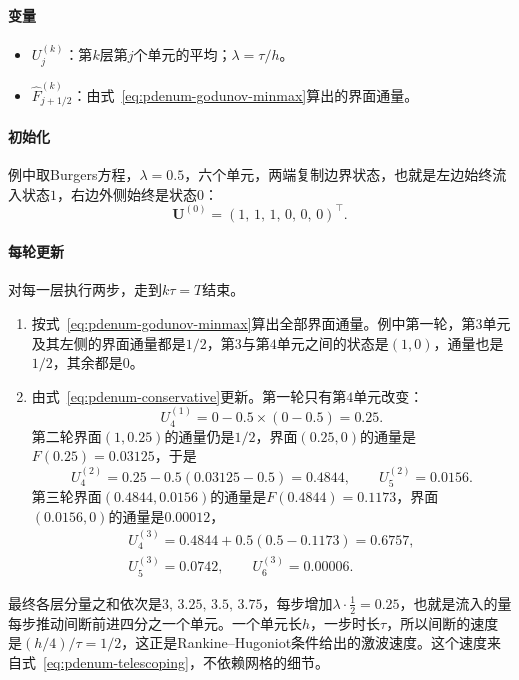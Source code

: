 \paragraph{变量}
\begin{itemize}
 \item $U_j^{(k)}$：第$k$层第$j$个单元的平均；$\lambda=\tau/h$。
 \item $\widehat{F}_{j+1/2}^{(k)}$：由式~\eqref{eq:pdenum-godunov-minmax}算出的界面通量。
\end{itemize}

\paragraph{初始化}
例中取Burgers方程，$\lambda=0.5$，六个单元，两端复制边界状态，也就是左边始终流入状态$1$，右边外侧始终是状态$0$：
\[
 \bm{U}^{(0)}=(1,\,1,\,1,\,0,\,0,\,0)^\top .
\]

\paragraph{每轮更新}
对每一层执行两步，走到$k\tau=T$结束。
\begin{enumerate}
 \item 按式~\eqref{eq:pdenum-godunov-minmax}算出全部界面通量。例中第一轮，第$3$单元及其左侧的界面通量都是$1/2$，第$3$与第$4$单元之间的状态是$(1,0)$，通量也是$1/2$，其余都是$0$。
 \item 由式~\eqref{eq:pdenum-conservative}更新。第一轮只有第$4$单元改变：
 \[
  U_4^{(1)}=0-0.5\times(0-0.5)=0.25 .
 \]
 第二轮界面$(1,0.25)$的通量仍是$1/2$，界面$(0.25,0)$的通量是$F(0.25)=0.03125$，于是
 \[
  U_4^{(2)}=0.25-0.5(0.03125-0.5)=0.4844,\qquad U_5^{(2)}=0.0156 .
 \]
 第三轮界面$(0.4844,0.0156)$的通量是$F(0.4844)=0.1173$，界面$(0.0156,0)$的通量是$0.00012$，
 \[
  \begin{gathered}
  U_4^{(3)}=0.4844+0.5(0.5-0.1173)=0.6757,\\
  U_5^{(3)}=0.0742,\qquad U_6^{(3)}=0.00006 .
  \end{gathered}
 \]
\end{enumerate}

最终各层分量之和依次是$3,\,3.25,\,3.5,\,3.75$，每步增加$\lambda\cdot\tfrac12=0.25$，也就是流入的量每步推动间断前进四分之一个单元。一个单元长$h$，一步时长$\tau$，所以间断的速度是$(h/4)/\tau=1/2$，这正是Rankine--Hugoniot条件给出的激波速度。这个速度来自式~\eqref{eq:pdenum-telescoping}，不依赖网格的细节。

